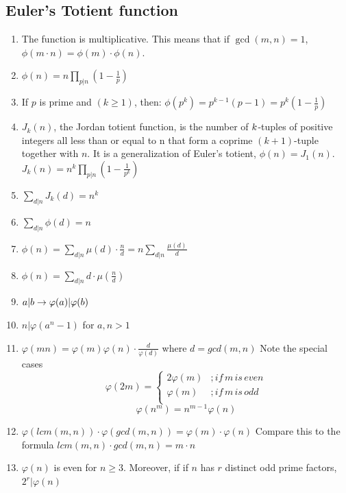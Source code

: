 \subsection{Euler’s Totient function}
\begin{enumerate}[resume]
    \item The function is multiplicative.
    This means that if $\displaystyle \gcd(m, n) = 1$, $\displaystyle \phi(m \cdot n) = \phi(m) \cdot \phi(n)$.
    \item $\displaystyle \phi(n) = n\prod_{p |n}(1 - \frac{1}{p} )$
    \item If $p$ is prime and $(k \geq 1)$, then:
    $\displaystyle \phi(p^k) = p^{k - 1}(p - 1) = p^k(1 - \frac{1}{p})$
    \item $J_k(n)$, the Jordan totient function, is the number of $\displaystyle \displaystyle k$-tuples of positive integers all less than or equal to n that form a coprime $\displaystyle (k + 1)$-tuple together with $n$. It is a generalization of Euler’s totient, $\displaystyle \phi(n) = J_1(n)$.
    \(J_k(n) = n^k\prod_{p |n}(1 - \frac{1}{p^k})\)
    \item $\displaystyle \sum_{d|n}J_k(d) = n^k$
    \item $\displaystyle \sum_{d|n}\phi(d) = n$
    \item $\displaystyle \phi(n) = \sum_{d|n}\mu(d)\cdot\frac{n}{d} = n\sum_{d|n}\frac{\mu(d)}{d}$
    \item $\displaystyle \phi(n) = \sum_{d|n}d\cdot\mu(\frac{n}{d})$
    \item $\displaystyle \displaystyle {a}\vert{b} \to \varphi(a)\vert{\varphi(b)}$
    \item $n\vert{\varphi(a^n - 1)}$ for $\displaystyle a, n > 1$
    \item $\displaystyle \varphi(mn)=\varphi(m)\varphi(n)\cdot\frac{d}{\varphi(d)}$ where $d=gcd(m, n)$
    Note the special cases
    \[\varphi(2m)=
    \begin{cases}
      2\varphi(m) & ; if \, m  \, is \, even\\
      \varphi(m) & ; if \, m \, is \, odd\\
    \end{cases}\]
    \[\displaystyle \varphi(n^m)=n^{m-1}\varphi(n)\]
    \item $\displaystyle \varphi(lcm(m, n)) \cdot \varphi(gcd(m, n))=\varphi(m) \cdot \varphi(n)$
    Compare this to the formula $lcm(m, n)\cdot gcd(m,n)=m\cdot n$
    \item $\displaystyle \varphi(n)$ is even for $n\geq3$. Moreover, if if $n$ has $r$ distinct odd prime factors, $\displaystyle 2^r \vert \varphi(n)$

\end{enumerate}

